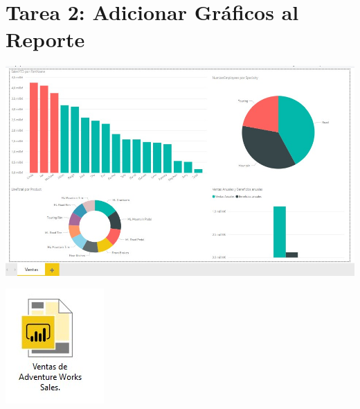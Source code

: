 \section{Tarea 2: Adicionar Gráficos al Reporte}

\begin{center}
\includegraphics[width=\columnwidth]{images/task2/task2-04}\newline
\end{center}

\begin{center}
\includegraphics{images/task2/task2-05}\newline
\end{center}